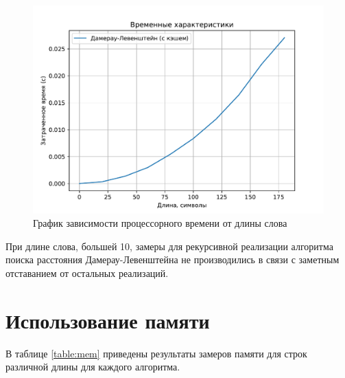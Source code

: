 \begin{figure}[H]
	\centering
	\includegraphics{assets/plots/cpu-cache.pdf}
	\caption{График зависимости процессорного времени от длины слова}
	\label{plt:cpu-cache}
\end{figure}

При длине слова, большей 10, замеры для рекурсивной реализации алгоритма поиска расстояния Дамерау-Левенштейна не производились в связи с заметным отставанием от остальных реализаций.


\section{Использование памяти}

В таблице \ref{table:mem} приведены результаты замеров памяти для строк различной длины для каждого алгоритма.

